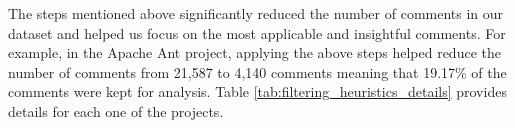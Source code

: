 The steps mentioned above significantly reduced the number of comments in our dataset and helped us focus on the most applicable and insightful comments. For example, in the Apache Ant project, applying the above steps helped reduce the number of comments from 21,587 to 4,140 comments meaning that 19.17\% of the comments were kept for analysis. Table \ref{tab:filtering_heuristics_details} provides details for each one of the projects.



